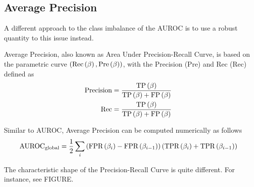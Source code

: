 \subsection{Average Precision}

A different approach to the class imbalance of the AUROC is to use a robust quantity to this issue instead.

Average Precision, also known as Area Under Precision-Recall Curve, is based on the parametric curve 
$\left( \text{Rec}\left( \beta \right), \text{Pre}\left( \beta \right) \right)$, with the Precision (Pre) and Rec (Rec) defined as
\begin{align}
\text{Precision}
&=
\frac{ \text{TP}\left( \beta \right) }{\text{TP}\left( \beta \right) + \text{FP}\left( \beta \right)}
\\
\text{Rec}
&=
\frac{ \text{TP}\left( \beta \right) }{\text{TP}\left( \beta \right) + \text{FP}\left( \beta \right)}
\end{align}

Similar to AUROC, Average Precision can be computed numerically as follows
\begin{equation}
\text{AUROC}_\text{global} =
\frac{1}{2}
\sum_{i}
\left(  \text{FPR}\left( \beta_i \right)-\text{FPR}\left( \beta_{i-1} \right)  \right)
\left(  \text{TPR}\left( \beta_i \right)+\text{TPR}\left( \beta_{i-1} \right)  \right)
\end{equation}

The characteristic shape of the Precision-Recall Curve is quite different. 
%
For instance, see FIGURE.